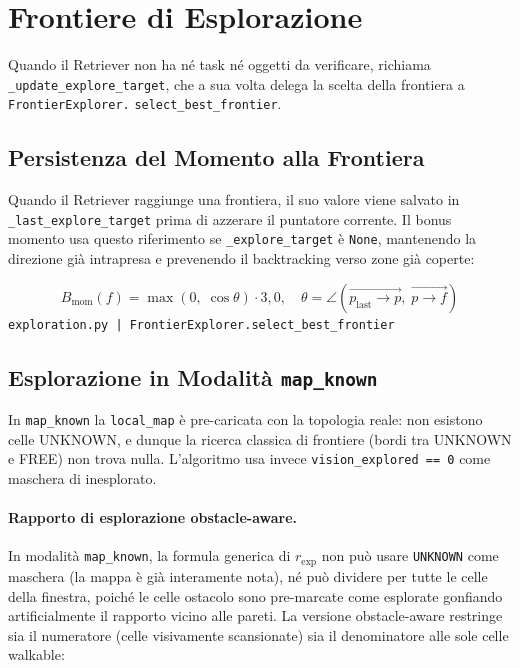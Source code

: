\section{Frontiere di Esplorazione}
\label{sec:retriever-explore}

\begin{sloppypar}
Quando il Retriever non ha n\'e task n\'e oggetti da verificare, richiama
\texttt{\_update\_explore\_target}, che a sua volta delega la scelta della frontiera
a \texttt{FrontierExplorer.}%
\texttt{select\_best\_frontier}.
\end{sloppypar}

\subsection{Persistenza del Momento alla Frontiera}

\begin{sloppypar}
Quando il Retriever raggiunge una frontiera, il suo valore viene salvato in
\texttt{\_last\_explore\_target} prima di azzerare il puntatore corrente. Il bonus
momento usa questo riferimento se \texttt{\_explore\_target} \`e \texttt{None},
mantenendo la direzione gi\`a intrapresa e prevenendo il backtracking verso
zone gi\`a coperte:
\end{sloppypar}

$$B_{\text{mom}}(f) = \max(0,\;\cos\theta) \cdot 3{,}0, \quad
  \theta = \angle(\overrightarrow{p_{\text{last}} \to p}, \; \overrightarrow{p \to f})$$
\noindent\hfill{\footnotesize\texttt{exploration.py | FrontierExplorer.select\_best\_frontier}}

\subsection{Esplorazione in Modalit\`a \texttt{map\_known}}

In \texttt{map\_known} la \texttt{local\_map} \`e pre-caricata con la topologia
reale: non esistono celle UNKNOWN, e dunque la ricerca classica di frontiere
(bordi tra UNKNOWN e FREE) non trova nulla.  L'algoritmo usa invece
\texttt{vision\_explored == 0} come maschera di inesplorato.

\paragraph{Rapporto di esplorazione obstacle-aware.}
In modalit\`a \texttt{map\_known}, la formula generica di $r_{\text{exp}}$ non pu\`o
usare \texttt{UNKNOWN} come maschera (la mappa \`e gi\`a interamente nota), n\'e pu\`o
dividere per tutte le celle della finestra, poich\'e le celle ostacolo sono pre-marcate
come esplorate gonfiando artificialmente il rapporto vicino alle pareti.  La versione
obstacle-aware restringe sia il numeratore (celle visivamente scansionate) sia il
denominatore alle sole celle walkable:


